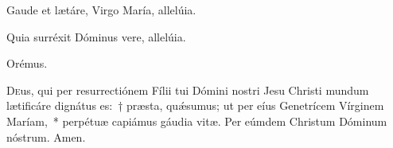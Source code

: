 
\vv Gaude et lætáre, Virgo María, allelúia.

\rr Quia surréxit Dóminus vere, allelúia.

Orémus.

\lettrine{D}{e}us, qui per resurrectiónem Fílii tui Dómini nostri Jesu Christi mundum lætificáre dignátus es:~† præsta, quǽsumus; ut per eíus Genetrícem Vírginem Maríam,~* perpétuæ capiámus gáudia vitæ. Per eúmdem Christum Dóminum nóstrum. \rr Amen.